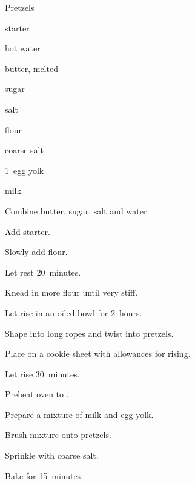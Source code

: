 \begin{recipe}{Pretzels}{}{}

\begin{ingredients}
\item {} starter
\item \C{\half} hot water
\item {} butter, melted
\item \Tp{1\half} sugar
\item {} salt
\item {} flour
\item coarse salt
\item 1~egg yolk
\item {} milk
\end{ingredients}

\begin{directions}
\item Combine butter, sugar, salt and water.
\item Add starter.
\item Slowly add  flour.
\item Let rest 20~minutes.
\item Knead in more flour until very stiff.
\item Let rise in an oiled bowl for 2~hours.
\item Shape into long ropes and twist into pretzels.
\item Place on a cookie sheet with allowances for rising.
\item Let rise 30~minutes.
\item Preheat oven to .
\item Prepare a mixture of milk and egg yolk.
\item Brush mixture onto pretzels.
\item Sprinkle with coarse salt.
\item Bake for 15~minutes.
\end{directions}
\end{recipe}
